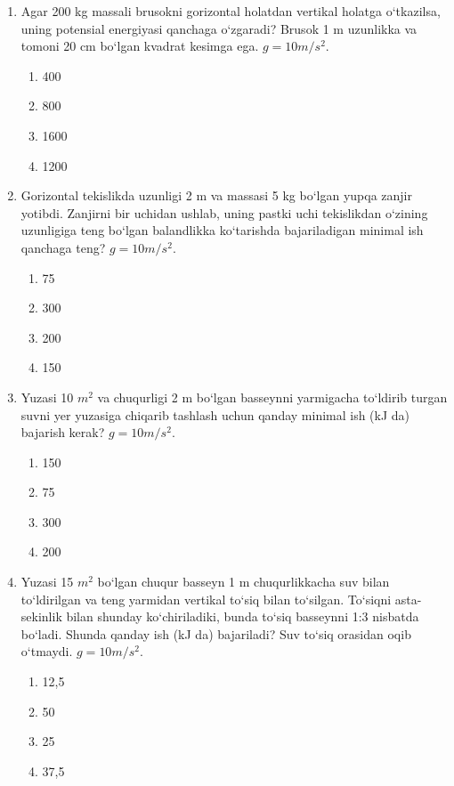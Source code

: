 \begin{enumerate}
\item Agar 200 kg massali brusokni gorizontal holatdan vertikal holatga o‘tkazilsa, uning potensial energiyasi qanchaga o‘zgaradi? Brusok 1 m uzunlikka va tomoni 20 cm bo‘lgan kvadrat kesimga ega. $g = 10 m/s^2$.
\begin{enumerate}[label=\Alph*)]
\item 400
\item 800
\item 1600
\item 1200
\end{enumerate}

\item Gorizontal tekislikda uzunligi 2 m va massasi 5 kg bo‘lgan yupqa zanjir yotibdi. Zanjirni bir uchidan ushlab, uning pastki uchi tekislikdan o‘zining uzunligiga teng bo‘lgan balandlikka ko‘tarishda bajariladigan minimal ish qanchaga teng? $g = 10 m/s^2$.
\begin{enumerate}[label=\Alph*)]
\item 75
\item 300
\item 200
\item 150
\end{enumerate}

\item Yuzasi 10 $m^2$ va chuqurligi 2 m bo‘lgan basseynni yarmigacha to‘ldirib turgan suvni yer yuzasiga chiqarib tashlash uchun qanday minimal ish (kJ da) bajarish kerak? $g = 10 m/s^2$.
\begin{enumerate}[label=\Alph*)]
\item 150
\item 75
\item 300
\item 200
\end{enumerate}

\item Yuzasi 15 $m^2$ bo‘lgan chuqur basseyn 1 m chuqurlikkacha suv bilan to‘ldirilgan va teng yarmidan vertikal to‘siq bilan to‘silgan. To‘siqni asta-sekinlik bilan shunday ko‘chiriladiki, bunda to‘siq basseynni 1:3 nisbatda bo‘ladi. Shunda qanday ish (kJ da) bajariladi? Suv to‘siq orasidan oqib o‘tmaydi. $g = 10 m/s^2$.
\begin{enumerate}[label=\Alph*)]
\item 12,5
\item 50
\item 25
\item 37,5
\end{enumerate}


\end{enumerate}
